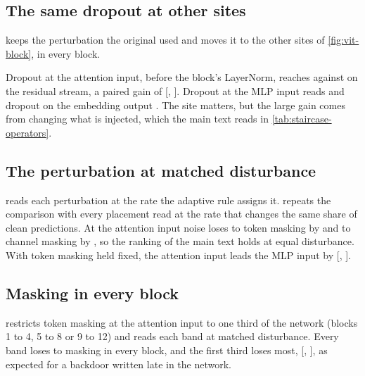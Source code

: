 \subsection{The same dropout at other sites}
\label{sec:results:sites}

 keeps the perturbation the original used and moves it to the other sites of \cref{fig:vit-block}, in every block.



Dropout at the attention input, before the block's LayerNorm, reaches \StaircaseDropoutSitesBeforeAttentionNormAuroc{} against \StaircaseDropoutSitesPostResidualAuroc{} on the residual stream, a paired gain of \StaircaseDropoutSitesBeforeAttentionNormGain{} [\StaircaseDropoutSitesBeforeAttentionNormGainLow{}, \StaircaseDropoutSitesBeforeAttentionNormGainHigh{}]. Dropout at the MLP input reads \StaircaseDropoutSitesBeforeMlpNormAuroc{} and dropout on the embedding output \StaircaseDropoutSitesAfterEmbeddingAuroc{}. The site matters, but the large gain comes from changing what is injected, which the main text reads in \cref{tab:staircase-operators}.


\subsection{The perturbation at matched disturbance}
\label{app:operators-matched}

 reads each perturbation at the rate the adaptive rule assigns it.  repeats the comparison with every placement read at the rate that changes the same share of clean predictions. At the attention input noise loses to token masking by \GaussianMinusTokenMaskAttentionNorm{} and to channel masking by \GaussianMinusChannelMaskAttentionNorm{}, so the ranking of the main text holds at equal disturbance. With token masking held fixed, the attention input leads the MLP input by \AttentionInputMinusMlpInputTokenMask{} [\AttentionInputMinusMlpInputTokenMaskLow{}, \AttentionInputMinusMlpInputTokenMaskHigh{}].


\FloatBarrier


\subsection{Masking in every block}
\label{app:bands}

 restricts token masking at the attention input to one third of the network (blocks 1 to 4, 5 to 8 or 9 to 12) and reads each band at matched disturbance. Every band loses to masking in every block, and the first third loses most, \BandOneFourMinusAllInputSide{} [\BandOneFourMinusAllInputSideLow{}, \BandOneFourMinusAllInputSideHigh{}], as expected for a backdoor written late in the network.

